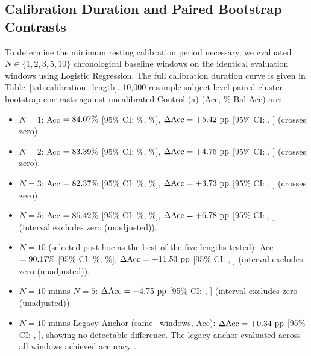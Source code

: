 \documentclass[conference]{IEEEtran}
\begin{document}
\subsection{Calibration Duration and Paired Bootstrap Contrasts}
To determine the minimum resting calibration period necessary, we evaluated $N \in \{1, 2, 3, 5, 10\}$ chronological baseline windows on the identical \valEvalWindows evaluation windows using Logistic Regression. The full calibration duration curve is given in Table~\ref{tab:calibration_length}. 10,000-resample subject-level paired cluster bootstrap contrasts against uncalibrated Control (a) (\valControlNoCalibAccPct Acc, \valControlNoCalibBalAcc\% Bal Acc) are:
\begin{itemize}
    \item $N=1$: Acc $= 84.07\%$ [95\% CI: \valNoneAccCILow\%, \valNoneAccCIHigh\%], $\Delta\text{Acc} = +5.42\text{ pp}$ [95\% CI: \valPairedGainNoneCILow, \valPairedGainNoneCIHigh] (crosses zero).
    \item $N=2$: Acc $= 83.39\%$ [95\% CI: \valNtwoAccCILow\%, \valNtwoAccCIHigh\%], $\Delta\text{Acc} = +4.75\text{ pp}$ [95\% CI: \valPairedGainNtwoCILow, \valPairedGainNtwoCIHigh] (crosses zero).
    \item $N=3$: Acc $= 82.37\%$ [95\% CI: \valNthreeAccCILow\%, \valNthreeAccCIHigh\%], $\Delta\text{Acc} = +3.73\text{ pp}$ [95\% CI: \valPairedGainNthreeCILow, \valPairedGainNthreeCIHigh] (crosses zero).
    \item $N=5$: Acc $= 85.42\%$ [95\% CI: \valNfiveAccCILow\%, \valNfiveAccCIHigh\%], $\Delta\text{Acc} = +6.78\text{ pp}$ [95\% CI: \valPairedGainNfiveCILow, \valPairedGainNfiveCIHigh] (interval excludes zero (unadjusted)).
    \item $N=10$ (selected post hoc as the best of the five lengths tested): Acc $= 90.17\%$ [95\% CI: \valNtenAccCILow\%, \valNtenAccCIHigh\%], $\Delta\text{Acc} = +11.53\text{ pp}$ [95\% CI: \valPairedGainNtenCILow, \valPairedGainNtenCIHigh] (interval excludes zero (unadjusted)).
    \item $N=10$ minus $N=5$: $\Delta\text{Acc} = +4.75\text{ pp}$ [95\% CI: \valPairedGainNtenVsNfiveCILow, \valPairedGainNtenVsNfiveCIHigh] (interval excludes zero (unadjusted)).
    \item $N=10$ minus Legacy Anchor (same \valEvalWindows\ windows, \valControlLeakyTwoNineFiveAccPct Acc): $\Delta\text{Acc} = +0.34\text{ pp}$ [95\% CI: \valPairedGainNtenVsLeakyCILow, \valPairedGainNtenVsLeakyCIHigh], showing no detectable difference. The legacy anchor evaluated across all \valTotalWindows windows achieved \valLegacyFourFourFiveAccPct accuracy \valLegacyFourFourFiveAccCI.
\end{itemize}
\end{document}
